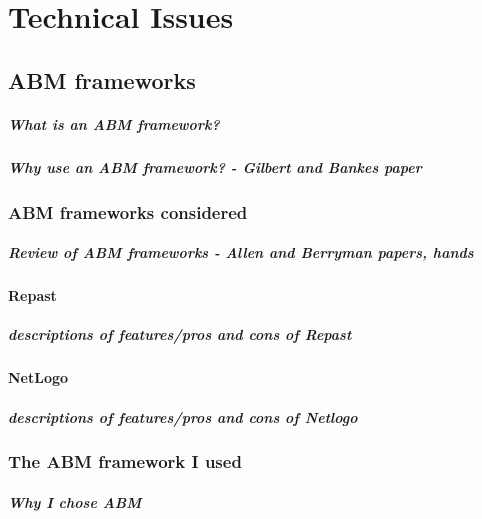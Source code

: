 \chapter{Technical Issues}
  \section{ABM frameworks}
    \paragraph{What is an ABM framework?}
    \paragraph{Why use an ABM framework? - Gilbert and Bankes paper}
    
    \subsection{ABM frameworks considered}
      \paragraph{Review of ABM frameworks - Allen and Berryman papers, hands}
      \subsubsection{Repast}
        \paragraph{descriptions of features/pros and cons of Repast}
      \subsubsection{NetLogo}
        \paragraph{descriptions of features/pros and cons of Netlogo}

    \subsection{The ABM framework I used}
      \paragraph{Why I chose ABM}

